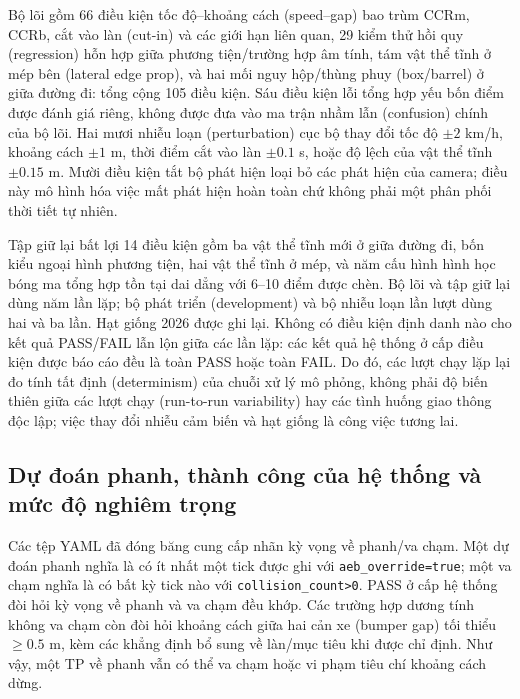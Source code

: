 \documentclass[conference]{IEEEtran}
\begin{document}
Bộ lõi gồm 66 điều kiện tốc độ--khoảng cách (speed--gap) bao trùm CCRm, CCRb,
cắt vào làn (cut-in) và các giới hạn liên quan, 29 kiểm thử hồi quy
(regression) hỗn hợp giữa phương tiện/trường hợp âm tính, tám vật thể tĩnh ở
mép bên (lateral edge prop), và hai mối nguy hộp/thùng phuy (box/barrel) ở
giữa đường đi: tổng cộng 105 điều kiện. Sáu điều kiện lỗi tổng hợp yếu bốn
điểm được đánh giá riêng, không được đưa vào ma trận nhầm lẫn (confusion)
chính của bộ lõi. Hai mươi nhiễu loạn (perturbation) cục bộ thay đổi tốc độ $\pm2$ km/h,
khoảng cách $\pm1$ m, thời điểm cắt vào làn $\pm0.1$ s, hoặc độ lệch của vật
thể tĩnh $\pm0.15$ m. Mười điều kiện tắt bộ phát hiện loại bỏ các phát hiện
của camera; điều này mô hình hóa việc mất phát hiện hoàn toàn chứ không phải
một phân phối thời tiết tự nhiên.

Tập giữ lại bất lợi 14 điều kiện gồm ba vật thể tĩnh mới ở giữa đường đi, bốn
kiểu ngoại hình phương tiện, hai vật thể tĩnh ở mép, và năm cấu hình hình học
bóng ma tổng hợp tồn tại dai dẳng với 6--10 điểm được chèn. Bộ lõi và tập giữ
lại dùng năm lần lặp; bộ phát triển (development) và bộ nhiễu loạn lần lượt
dùng hai và ba lần. Hạt giống 2026 được ghi lại. Không có điều kiện định danh
nào cho kết quả PASS/FAIL lẫn lộn giữa các lần lặp: các kết quả hệ thống ở cấp
điều kiện được báo cáo đều là toàn PASS hoặc toàn FAIL. Do đó, các lượt chạy
lặp lại đo tính tất định (determinism) của chuỗi xử lý mô phỏng, không phải độ
biến thiên giữa các lượt chạy (run-to-run variability) hay các tình huống giao
thông độc lập; việc thay đổi nhiễu cảm biến và hạt giống là công việc tương
lai.

\subsection{Dự đoán phanh, thành công của hệ thống và mức độ nghiêm trọng}
Các tệp YAML đã đóng băng cung cấp nhãn kỳ vọng về phanh/va chạm. Một dự đoán
phanh nghĩa là có ít nhất một tick được ghi với \texttt{aeb\_override=true};
một va chạm nghĩa là có bất kỳ tick nào với \texttt{collision\_count>0}. PASS
ở cấp hệ thống đòi hỏi kỳ vọng về phanh và va chạm đều khớp. Các trường hợp
dương tính không va chạm còn đòi hỏi khoảng cách giữa hai cản xe (bumper gap)
tối thiểu $\geq0.5$ m, kèm các khẳng định bổ sung về làn/mục tiêu khi được chỉ
định. Như vậy, một TP về phanh vẫn có thể va chạm hoặc vi phạm tiêu chí khoảng
cách dừng.
\end{document}
